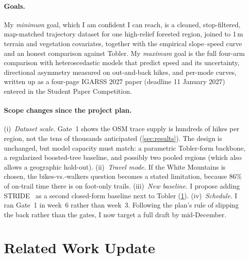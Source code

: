 \documentclass[10pt,twocolumn,letterpaper]{article}
\begin{document}
\paragraph{Goals.} My \emph{minimum} goal, which I am confident I can reach, is a cleaned, stop-filtered, map-matched trajectory dataset for one high-relief forested region, joined to 1\,m terrain and vegetation covariates, together with the empirical slope--speed curve and an honest comparison against Tobler. My \emph{maximum} goal is the full four-arm comparison with heteroscedastic models that predict speed and its uncertainty, directional asymmetry measured on out-and-back hikes, and per-mode curves, written up as a four-page IGARSS 2027 paper (deadline 11 January 2027) entered in the Student Paper Competition.

\paragraph{Scope changes since the project plan.}
(i)~\emph{Dataset scale.} Gate~1 shows the OSM trace supply is hundreds of hikes per region, not the tens of thousands anticipated (\cref{sec:results}). The design is unchanged, but model capacity must match: a parametric Tobler-form backbone, a regularized boosted-tree baseline, and possibly two pooled regions (which also allows a geographic hold-out).
(ii)~\emph{Travel mode.} If the White Mountains is chosen, the bikes-vs.-walkers question becomes a stated limitation, because 86\% of on-trail time there is on foot-only trails.
(iii)~\emph{New baseline.} I propose adding STRIDE~\cite{campbell2024stride} as a second closed-form baseline next to Tobler (\cref{sec:related}).
(iv)~\emph{Schedule.} I ran Gate~1 in week~6 rather than week~3. Following the plan's rule of slipping the back rather than the gates, I now target a full draft by mid-December.

\section{Related Work Update}
\label{sec:related}
\end{document}
